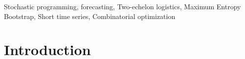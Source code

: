 \documentclass[preprint,11pt,authoryear]{elsarticle}
\begin{document}
\begin{frontmatter}

\begin{keyword}
Stochastic programming, forecasting, Two-echelon logistics, Maximum Entropy Bootstrap, Short time series, Combinatorial optimization


\end{keyword}

\end{frontmatter}

\section{Introduction} \label{Sec:intro}
\end{document}
